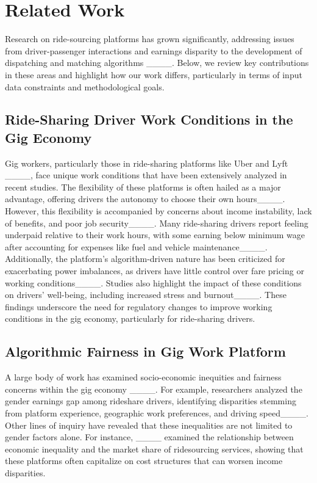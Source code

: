 \section{Related Work}
Research on ride-sourcing platforms has grown significantly, addressing issues from driver-passenger interactions and earnings disparity to the development of dispatching and matching algorithms ____. 
Below, we review key contributions in these areas and highlight how our work differs, particularly in terms of input data constraints and methodological goals.

\subsection{Ride-Sharing Driver Work Conditions in the Gig Economy}

Gig workers, particularly those in ride-sharing platforms like Uber and Lyft ____, face unique work conditions that have been extensively analyzed in recent studies. The flexibility of these platforms is often hailed as a major advantage, offering drivers the autonomy to choose their own hours____. However, this flexibility is accompanied by concerns about income instability, lack of benefits, and poor job security____. Many ride-sharing drivers report feeling underpaid relative to their work hours, with some earning below minimum wage after accounting for expenses like fuel and vehicle maintenance____. Additionally, the platform's algorithm-driven nature has been criticized for exacerbating power imbalances, as drivers have little control over fare pricing or working conditions____. Studies also highlight the impact of these conditions on drivers' well-being, including increased stress and burnout____. These findings underscore the need for regulatory changes to improve working conditions in the gig economy, particularly for ride-sharing drivers.

\subsection{Algorithmic Fairness in Gig Work Platform}

A large body of work has examined socio-economic inequities and fairness concerns within the gig economy ____. For example, researchers analyzed the gender earnings gap among rideshare drivers, identifying disparities stemming from platform experience, geographic work preferences, and driving speed____. Other lines of inquiry have revealed that these inequalities are not limited to gender factors alone. For instance, ____ examined the relationship between economic inequality and the market share of ridesourcing services, showing that these platforms often capitalize on cost structures that can worsen income disparities.

